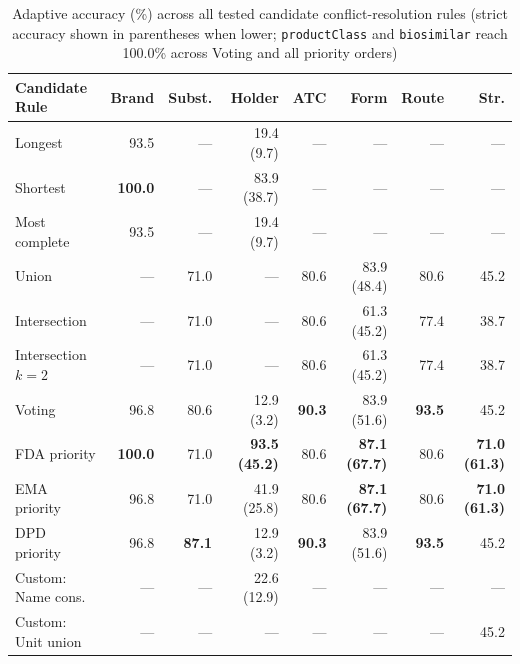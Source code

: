 \documentclass{llncs}
\begin{document}
\begin{table}[htbp]
\centering
\caption{Adaptive accuracy (\%) across all tested candidate conflict-resolution rules (strict accuracy shown in parentheses when lower; \texttt{productClass} and \texttt{biosimilar} reach 100.0\% across Voting and all priority orders)}
\label{tab:fusion_rule_comparison}
\scriptsize
\setlength{\tabcolsep}{2.0pt}
\begin{tabularx}{\textwidth}{|>{\raggedright\arraybackslash}X|r|r|r|r|r|r|r|}
\hline
\textbf{Candidate Rule} & \textbf{Brand} & \textbf{Subst.} & \textbf{Holder} & \textbf{ATC} & \textbf{Form} & \textbf{Route} & \textbf{Str.} \\
\hline
Longest                &  93.5 & ---  & 19.4 (9.7)  & ---  & ---         & ---  & --- \\
Shortest               & \textbf{100.0} & ---  & 83.9 (38.7) & ---  & ---         & ---  & --- \\
Most complete          &  93.5 & ---  & 19.4 (9.7)  & ---  & ---         & ---  & --- \\
Union                  & ---   & 71.0 & ---         & 80.6 & 83.9 (48.4) & 80.6 & 45.2 \\
Intersection           & ---   & 71.0 & ---         & 80.6 & 61.3 (45.2) & 77.4 & 38.7 \\
Intersection $k=2$     & ---   & 71.0 & ---         & 80.6 & 61.3 (45.2) & 77.4 & 38.7 \\
\hline
Voting                 &  96.8 & 80.6 & 12.9 (3.2)  & \textbf{90.3} & 83.9 (51.6) & \textbf{93.5} & 45.2 \\
FDA priority           & \textbf{100.0} & 71.0 & \textbf{93.5 (45.2)} & 80.6 & \textbf{87.1 (67.7)} & 80.6 & \textbf{71.0 (61.3)} \\
EMA priority           &  96.8 & 71.0 & 41.9 (25.8) & 80.6 & \textbf{87.1 (67.7)} & 80.6 & \textbf{71.0 (61.3)} \\
DPD priority           &  96.8 & \textbf{87.1} & 12.9 (3.2)  & \textbf{90.3} & 83.9 (51.6) & \textbf{93.5} & 45.2 \\
\hline
Custom: Name cons.     & ---   & ---  & 22.6 (12.9) & ---  & ---         & ---  & --- \\
Custom: Unit union     & ---   & ---  & ---         & ---  & ---         & ---  & 45.2 \\
\hline
\end{tabularx}
\end{table}
\end{document}
